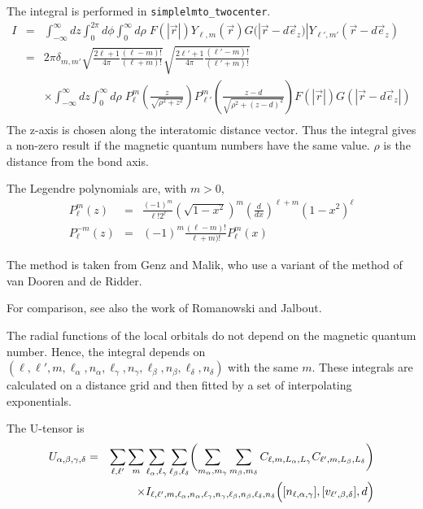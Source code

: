 \documentclass[11pt,a4paper]{report}
\begin{document}
The integral is performed in \verb|simplelmto_twocenter|.
\begin{eqnarray}
I&=&\int_{-\infty}^\infty dz \int_0^{2\pi}d\phi \int_0^\infty d\rho\;
F(|\vec{r}|)Y_{\ell,m}(\vec{r})G(|\vec{r}-d\vec{e}_z)|Y_{\ell',m'}(\vec{r}-d\vec{e}_z) 
\nonumber\\
&=& 2\pi\delta_{m,m'}
\sqrt{\frac{2\ell+1}{4\pi}\frac{(\ell-m)!}{(\ell+m)!}}
\sqrt{\frac{2\ell'+1}{4\pi}\frac{(\ell'-m)!}{(\ell'+m)!}}
\nonumber\\
&&\times\int_{-\infty}^{\infty}dz \int_{0}^{\infty} d\rho\;
P^{m}_{\ell}\left(\frac{z}{\sqrt{\rho^2+z^2}}\right)
P^{m}_{\ell'}\left(\frac{z-d}{\sqrt{\rho^2+(z-d)^2}}\right)
F(|\vec{r}|)G(|\vec{r}-d\vec{e}_z|)
\nonumber\\
\label{eq:twocenterintegral}
\end{eqnarray}
The z-axis is chosen along the interatomic distance vector.  Thus the
integral gives a non-zero result if the magnetic quantum numbers have
the same value. $\rho$ is the distance from the bond axis.

The Legendre polynomials are, with $m>0$,
\begin{eqnarray}
P^{m}_{\ell}(z)&=&\frac{(-1)^m}{\ell!2^\ell} (\sqrt{1-x^2})^m\left(\frac{d}{dx}\right)^{\ell+m}(1-x^2)^\ell
\nonumber\\
P^{-m}_{\ell}(z)&=&(-1)^m\frac{(\ell-m)!}{\ell+m)!} P^{m}_{\ell}(x)
\end{eqnarray}



The method is taken from Genz and
Malik\cite{genz80_jcomputapplmath6_295}, who use a variant of the
method of van Dooren and de
Ridder\cite{vandooren76_jcomputapplmath2_207}.

For comparison, see also the work of Romanowski and Jalbout.
\cite{romanowski08_ijqc108_249,romanowski08_ijqc108_487,romanowski08_ijqc108_1465,romanowski09_jmathchem46_97}



The radial functions of the local orbitals do not depend on the
magnetic quantum number. Hence, the integral depends on
$(\ell,\ell',m,\ell_\alpha,n_\alpha,\ell_\gamma,n_\gamma,\ell_\beta,n_\beta,\ell_\delta,n_\delta)$
with the same $m$.  These integrals are calculated on a distance grid
and then fitted by a set of interpolating exponentials.

The U-tensor is
\begin{eqnarray}
U_{\alpha,\beta,\gamma,\delta}
&=&\sum_{\ell,\ell'}\sum_m\sum_{\ell_\alpha,\ell_\gamma}\sum_{\ell_\beta,\ell_\delta}
\biggl(\sum_{m_\alpha,m_\gamma}\sum_{m_\beta,m_\delta}
C_{\ell,m,L_\alpha,L_\gamma}C_{\ell',m,L_\beta,L_\delta}
\biggr)
\nonumber\\
&&\times I_{\ell,\ell',m,\ell_\alpha,n_\alpha,\ell_\gamma,n_\gamma,\ell_\beta,n_\beta,\ell_\delta,n_\delta}
\Bigl([n_{\ell,\alpha,\gamma}],[v_{\ell',\beta,\delta}],d\Bigr)
\end{eqnarray}
\end{document}
